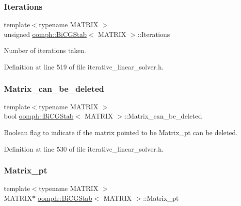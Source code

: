 \subsubsection{\texorpdfstring{Iterations}{Iterations}}
{\footnotesize\ttfamily template$<$typename M\+A\+T\+R\+IX $>$ \\
unsigned \hyperlink{classoomph_1_1BiCGStab}{oomph\+::\+Bi\+C\+G\+Stab}$<$ M\+A\+T\+R\+IX $>$\+::Iterations\hspace{0.3cm}{\ttfamily [private]}}



Number of iterations taken. 



Definition at line 519 of file iterative\+\_\+linear\+\_\+solver.\+h.

\mbox{\label{classoomph_1_1BiCGStab_a4314b4e4044e111412b5c0150250829f}} 
\subsubsection{\texorpdfstring{Matrix\+\_\+can\+\_\+be\+\_\+deleted}{Matrix\_can\_be\_deleted}}
{\footnotesize\ttfamily template$<$typename M\+A\+T\+R\+IX $>$ \\
bool \hyperlink{classoomph_1_1BiCGStab}{oomph\+::\+Bi\+C\+G\+Stab}$<$ M\+A\+T\+R\+IX $>$\+::Matrix\+\_\+can\+\_\+be\+\_\+deleted\hspace{0.3cm}{\ttfamily [private]}}



Boolean flag to indicate if the matrix pointed to be Matrix\+\_\+pt can be deleted. 



Definition at line 530 of file iterative\+\_\+linear\+\_\+solver.\+h.

\mbox{\label{classoomph_1_1BiCGStab_a618f4b5ef6a92b4a7163986f40b62f18}} 
\subsubsection{\texorpdfstring{Matrix\+\_\+pt}{Matrix\_pt}}
{\footnotesize\ttfamily template$<$typename M\+A\+T\+R\+IX $>$ \\
M\+A\+T\+R\+IX$\ast$ \hyperlink{classoomph_1_1BiCGStab}{oomph\+::\+Bi\+C\+G\+Stab}$<$ M\+A\+T\+R\+IX $>$\+::Matrix\+\_\+pt\hspace{0.3cm}{\ttfamily [private]}}



